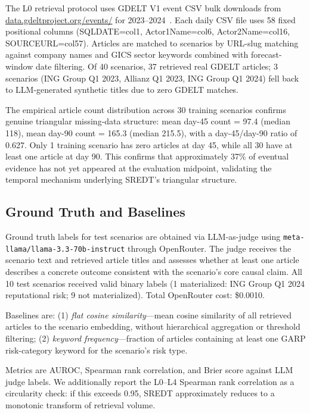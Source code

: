 \documentclass[11pt,letterpaper]{article}
\begin{document}
The L0 retrieval protocol uses GDELT V1 event CSV bulk downloads from \url{data.gdeltproject.org/events/} for 2023--2024~\citep{Leetaru2013}. Each daily CSV file uses 58 fixed positional columns (SQLDATE=col1, Actor1Name=col6, Actor2Name=col16, SOURCEURL=col57). Articles are matched to scenarios by URL-slug matching against company names and GICS sector keywords combined with forecast-window date filtering. Of 40 scenarios, 37 retrieved real GDELT articles; 3 scenarios (ING Group Q1 2023, Allianz Q1 2023, ING Group Q1 2024) fell back to LLM-generated synthetic titles due to zero GDELT matches.

The empirical article count distribution across 30 training scenarios confirms genuine triangular missing-data structure: mean day-45 count = 97.4 (median 118), mean day-90 count = 165.3 (median 215.5), with a day-45/day-90 ratio of 0.627. Only 1 training scenario has zero articles at day 45, while all 30 have at least one article at day 90. This confirms that approximately 37\% of eventual evidence has not yet appeared at the evaluation midpoint, validating the temporal mechanism underlying SREDT's triangular structure.

\subsection{Ground Truth and Baselines}

Ground truth labels for test scenarios are obtained via LLM-as-judge using \texttt{meta-llama/llama-3.3-70b-instruct} through OpenRouter. The judge receives the scenario text and retrieved article titles and assesses whether at least one article describes a concrete outcome consistent with the scenario's core causal claim. All 10 test scenarios received valid binary labels (1 materialized: ING Group Q1 2024 reputational risk; 9 not materialized). Total OpenRouter cost: \$0.0010.

Baselines are: (1) \emph{flat cosine similarity}---mean cosine similarity of all retrieved articles to the scenario embedding, without hierarchical aggregation or threshold filtering; (2) \emph{keyword frequency}---fraction of articles containing at least one GARP risk-category keyword for the scenario's risk type.

Metrics are AUROC, Spearman rank correlation, and Brier score against LLM judge labels. We additionally report the L0--L4 Spearman rank correlation as a circularity check: if this exceeds 0.95, SREDT approximately reduces to a monotonic transform of retrieval volume.
\end{document}

